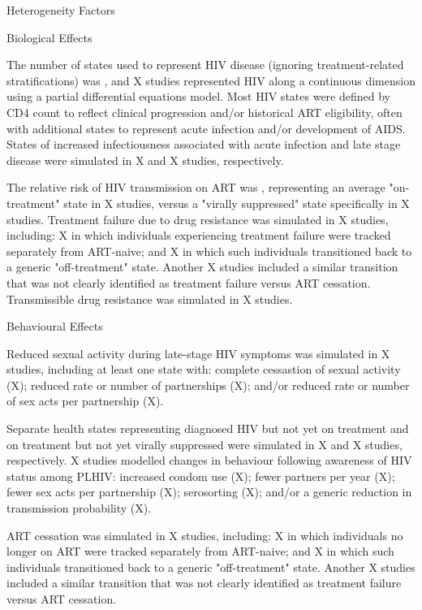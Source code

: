 Heterogeneity Factors

Biological Effects

The \xdmdef number of states used to represent HIV disease
(ignoring treatment-related stratifications) was ,
and X studies represented HIV along a continuous dimension
using a partial differential equations model.
Most HIV states were defined by CD4 count
to reflect clinical progression and/or historical ART eligibility,
often with additional states to represent acute infection and/or development of AIDS.
States of increased infectiousness associated with acute infection and late stage disease
were simulated in X and X studies, respectively.

The relative risk of HIV transmission on ART was ,
representing an average "on-treatment" state in X studies,
versus a "virally suppressed" state specifically in X studies.
Treatment failure due to drug resistance was simulated in X studies, including:
X in which individuals experiencing treatment failure
were tracked separately from ART-naive; and
X in which such individuals
transitioned back to a generic "off-treatment" state.
Another X studies included a similar transition
that was not clearly identified as treatment failure versus ART cessation.
Transmissible drug resistance was simulated in X studies.

Behavioural Effects

Reduced sexual activity during late-stage HIV symptoms was simulated in X studies,
including at least one state with:
complete cessastion of sexual activity (X);
reduced rate or number of partnerships (X); and/or
reduced rate or number of sex acts per partnership (X).

Separate health states representing diagnosed HIV but not yet on treatment
and on treatment but not yet virally suppressed were simulated in
X and X studies, respectively.
X studies modelled changes in behaviour following awareness of HIV status among PLHIV:
increased condom use (X);
fewer partners per year (X);
fewer sex acts per partnership (X);
serosorting (X); and/or
a generic reduction in transmission probability (X).

ART cessation was simulated in X studies, including:
X in which individuals no longer on ART
were tracked separately from ART-naive; and
X in which such individuals
transitioned back to a generic "off-treatment" state.
Another X studies included a similar transition
that was not clearly identified as treatment failure versus ART cessation.


